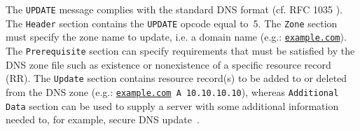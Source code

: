 The \texttt{UPDATE} message complies with the standard DNS %
format (cf. RFC 1035 \cite{rfc1035}).
The \texttt{Header} section contains the \texttt{UPDATE} opcode equal to~5. The \texttt{Zone} section must specify the zone name to update, i.e. a domain name (e.g.: \texttt{\url{example.com}}). The \texttt{Prerequisite} section can specify 
requirements %
that must be satisfied by the DNS zone file such as existence or nonexistence of a specific resource record (RR). %
The \texttt{Update} section contains resource record(s) to be added to or deleted from the DNS zone (e.g.:  \texttt{\url{example.com} A 10.10.10.10}), whereas \texttt{Additional Data} section can be used to supply a server with some additional information needed to, for example,  secure DNS update~\cite{rfc2136}.

